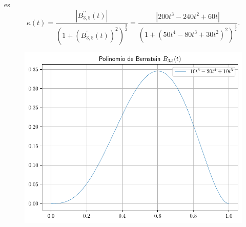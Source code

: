 \begin{frame}
\begin{solution}
        es
        \begin{equation*}
            \kappa\left(t\right)=
            \dfrac{
                \left|
                B^{\prime\prime}_{3,5}\left(t\right)
                \right|
            }{
                {\left(1+{\left(B^{\prime}_{3,5}\left(t\right)\right)}^{2}\right)}^{\frac{3}{2}}
            }=
            \dfrac{
            \left|
            200t^{3}-240t^{2}+60t
            \right|
            }{
            {\left(1+{\left(50t^{4}-80t^{3}+30t^{2}\right)}^{2}\right)}^{\frac{3}{2}}
            }.
        \end{equation*}
    \end{solution}
\end{frame}

\begin{frame}
    \begin{solution}
        \begin{figure}[ht!]
            \centering
            \includegraphics[width=.72\paperwidth]{p1}
        \end{figure}
    \end{solution}
\end{frame}

